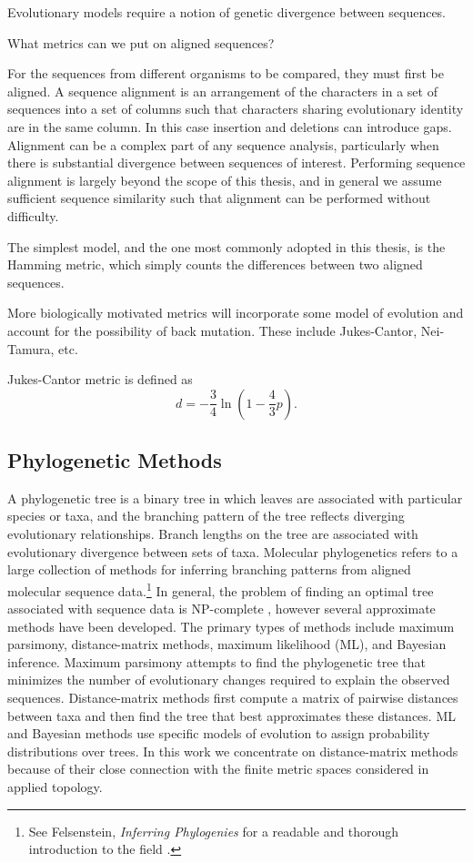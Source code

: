 Evolutionary models require a notion of genetic divergence between sequences.


What metrics can we put on aligned sequences?

For the sequences from different organisms to be compared, they must first be aligned.
A sequence alignment is an arrangement of the characters in a set of sequences into a set of columns such that characters sharing evolutionary identity are in the same column.
In this case insertion and deletions can introduce gaps.
Alignment can be a complex part of any sequence analysis, particularly when there is substantial divergence between sequences of interest.
Performing sequence alignment is largely beyond the scope of this thesis, and in general we assume sufficient sequence similarity such that alignment can be performed without difficulty.

The simplest model, and the one most commonly adopted in this thesis, is the Hamming metric, which simply counts the differences between two aligned sequences.

More biologically motivated metrics will incorporate some model of evolution and account for the possibility of back mutation.
These include Jukes-Cantor, Nei-Tamura, etc.

Jukes-Cantor metric is defined as 
\begin{equation}
d=-\frac{3}{4}\ln(1-\frac{4}{3}p).
\end{equation}

\subsection{Phylogenetic Methods}

A phylogenetic tree is a binary tree in which leaves are associated with particular species or taxa, and the branching pattern of the tree reflects diverging evolutionary relationships.
Branch lengths on the tree are associated with evolutionary divergence between sets of taxa.
Molecular phylogenetics refers to a large collection of methods for inferring branching patterns from aligned molecular sequence data.\footnote{See Felsenstein, \emph{Inferring Phylogenies} for a readable and thorough introduction to the field \cite{Felsenstein:2004ws}.}
In general, the problem of finding an optimal tree associated with sequence data is NP-complete \cite{Foulds:1982fn}, however several approximate methods have been developed.
The primary types of methods include maximum parsimony, distance-matrix methods, maximum likelihood (ML), and Bayesian inference.
Maximum parsimony attempts to find the phylogenetic tree that minimizes the number of evolutionary changes required to explain the observed sequences.
Distance-matrix methods first compute a matrix of pairwise distances between taxa and then find the tree that best approximates these distances.
ML and Bayesian methods use specific models of evolution to assign probability distributions over trees.
In this work we concentrate on distance-matrix methods because of their close connection with the finite metric spaces considered in applied topology.


